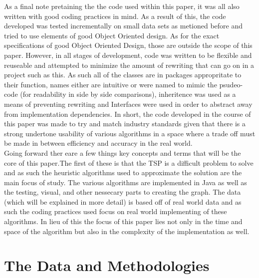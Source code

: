 \documentclass[midd]{thesis}
\newcommand{\tab}{\hspace*{2em}}
\begin{document}
\tab As a final note pretaining the the code used within this paper, it was all also written with good coding practices in mind. As a result of this, the code developed was tested incrementally on small data sets as metioned before and tried to use elements of good Object Oriented design. As for the exact specifications of good Object Oriented Design, those are outside the scope of this paper. However, in all stages of development, code was written to be flexible and reuseable and attempted to minimize the amount of rewriting that can go on in a project such as this. As such all of the classes are in packages appropritate to their function, names either are intuitive or were named to mimic the psudeo-code (for readability in side by side comparisons), inheritence was used as a means of preventing rewriting and Interfaces were used in order to abstract away from implementation dependencies. In short, the code developed in the course of this paper was made to try and match industry standards given that there is a strong undertone usability of various algorithms in a space where a trade off must be made in between efficiency and accuracy in the real world.\\
\tab Going forward ther eare a few things key concepts and terms that will be the core of this paper.The first of these is that the TSP is a difficult problem to solve and as such the heuristic algorithms used to approximate the solution are the main focus of study. The various algorithms are implemented in Java as well as the testing, visual, and other nessecary parts to creating the graph. The data (which will be explained in more detail) is based off of real world data and as such the coding practices used focus on real world implementing of these algorithms. In lieu of this the focus of this paper lies not only in the time and space of the algorithm but also in the complexity of the implementation as well.

\chapter{The Data and Methodologies}
\end{document}
